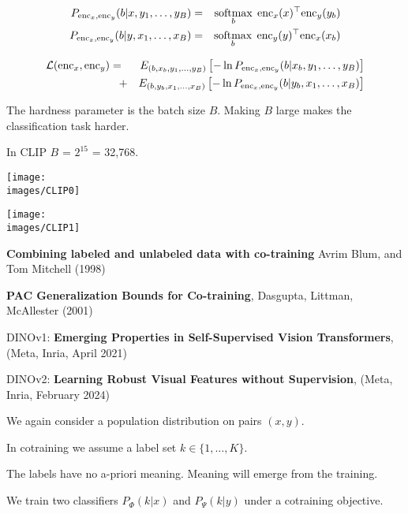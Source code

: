 {{\vfill
\begin{eqnarray*}
P_{\mathrm{enc}_x,\mathrm{enc}_y}(b|x,y_1,\ldots,y_B) & = & \operatorname*{softmax}_b\; \mathrm{enc}_x(x)^\top\mathrm{enc}_y(y_b) \\
P_{\mathrm{enc}_x,\mathrm{enc}_y}(b|y,x_1,\ldots,x_B) & = & \operatorname*{softmax}_b\; \mathrm{enc}_y(y)^\top\mathrm{enc}_x(x_b) \\
\end{eqnarray*}
}



{\huge
\begin{eqnarray*}
{\cal L}(\mathrm{enc}_x,\mathrm{enc}_y) & = & E_{(b,x_b,y_1,\ldots,y_B)}\left[-\ln P_{\mathrm{enc}_x,\mathrm{enc}_y}(b|x_b,y_1,\ldots,y_B)\right] \\
& \;\;\;+ & E_{(b,y_b,x_1,\ldots,x_B)}\left[-\ln P_{\mathrm{enc}_x,\mathrm{enc}_y}(b|y_b,x_1,\ldots,x_B)\right]
\end{eqnarray*}

\vfill
The hardness parameter is the batch size $B$.  Making $B$ large makes the classification task harder.

\vfill
In CLIP $B$ = $2^{15}$ = 32,768.


\centerline{\texttt{[image: \\images/CLIP0]}}


\centerline{\texttt{[image: \\images/CLIP1]}}



{\bf Combining labeled and unlabeled data with co-training} Avrim Blum, and Tom Mitchell (1998)

\vfill
{\bf PAC Generalization Bounds for Co-training}, Dasgupta, Littman, McAllester (2001)

\vfill
DINOv1: {\bf Emerging Properties in Self-Supervised Vision Transformers}, (Meta, Inria, April 2021)

\vfill
DINOv2: {\bf Learning Robust Visual Features without Supervision}, (Meta, Inria, February 2024)


We again consider a population distribution on pairs $(x,y)$.

\vfill
In cotraining we assume a label set $k \in \{1,\ldots,K\}$.

\vfill
The labels have no a-priori meaning.  Meaning will emerge from the training.

\vfill
We train two classifiers $P_\Phi(k|x)$ and $P_\Psi(k|y)$ under a cotraining objective.

}}
